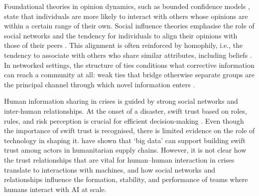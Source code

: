 \documentclass[sn-apacite]{sn-jnl}
\begin{document}
Foundational theories in opinion dynamics, such as bounded confidence models \citep{hegselmann2002opinion}, state that individuals are more likely to interact with others whose opinions are within a certain range of their own. Social influence theories emphasise the role of social networks and the tendency for individuals to align their opinions with those of their peers \citep{friedkin1999social}. This alignment is often reinforced by homophily, i.e., the tendency to associate with others who share similar attributes, including beliefs \citep{mcpherson2001birds}. In networked settings, the structure of ties conditions what corrective information can reach a community at all: weak ties that bridge otherwise separate groups are the principal channel through which novel information enters \citep{granovetter1973strength}. %

Human information sharing in crises is guided by strong social networks and inter-human relationships. At the onset of a disaster, swift trust based on roles, rules, and risk perception is crucial for efficient decision-making \citep{tatham2010application}. Even though the importance of swift trust is recognised, there is limited evidence on the role of technology in shaping it. \citet{dubey2018big} have shown that `big data' can support building swift trust among actors in humanitarian supply chains. However, it is not clear how the trust relationships that are vital for human--human interaction in crises translate to interactions with machines, and how social networks and relationships influence the formation, stability, and performance of teams where humans interact with AI at scale.
\end{document}
